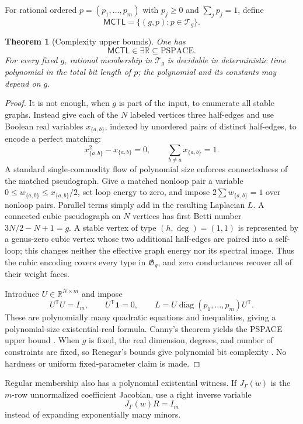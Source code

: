 \documentclass[11pt,reqno]{amsart}
\newtheorem{theorem}{Theorem}[section]
\theoremstyle{definition}
\theoremstyle{remark}
\newcommand{\one}{\mathbf 1}
\newcommand{\R}{\mathbb R}
\newcommand{\diag}{\operatorname{diag}}
\begin{document}
For rational ordered $p=(p_1,\ldots,p_m)$ with $p_j\ge0$ and
$\sum_jp_j=1$, define
\[
 \textsf{MCTL}=\{(g,p):p\in\mathcal T_g\}.
\]

\begin{theorem}[Complexity upper bounds]\label{thm:MCTL-complexity}
One has
\[
 \textsf{MCTL}\in\exists\mathbb R\subseteq\mathrm{PSPACE}.
\]
For every fixed $g$, rational membership in $\mathcal T_g$ is decidable in
deterministic time polynomial in the total bit length of $p$; the polynomial
and its constants may depend on $g$.
\end{theorem}

\begin{proof}
It is not enough, when $g$ is part of the input, to enumerate all stable
graphs.  Instead give each of the $N$ labeled vertices three half-edges and
use Boolean real variables $x_{\{a,b\}}$, indexed by unordered pairs of
distinct half-edges, to encode a perfect matching:
\[
 x_{\{a,b\}}^2-x_{\{a,b\}}=0,\qquad
 \sum_{b\ne a}x_{\{a,b\}}=1.
\]
A standard single-commodity flow of polynomial size enforces connectedness
of the matched pseudograph.  Give a matched nonloop pair a variable
$0\le w_{\{a,b\}}\le x_{\{a,b\}}/2$, set loop energy to zero, and impose
$2\sum w_{\{a,b\}}=1$ over nonloop pairs.  Parallel terms simply add in the resulting Laplacian
$L$.  A connected cubic pseudograph on $N$ vertices has first Betti number
$3N/2-N+1=g$.  A stable vertex of type $(h,\deg)=(1,1)$ is represented by a
genus-zero cubic vertex whose two additional half-edges are paired into a
self-loop; this changes neither the effective graph energy nor its spectral
image.  Thus the cubic encoding covers every type in $\mathfrak G_g$, and
zero conductances recover all of their weight faces.

Introduce $U\in\R^{N\times m}$ and impose
\begin{equation}\label{eq:ETR-eigenbasis}
 U^{\mathsf T}U=I_m,\qquad U^{\mathsf T}\one=0,\qquad
 L=U\diag(p_1,\ldots,p_m)U^{\mathsf T}.
\end{equation}
These are polynomially many quadratic equations and inequalities, giving a
polynomial-size existential-real formula.  Canny's theorem yields the PSPACE
upper bound \cite{Canny1988}.  When $g$ is fixed, the real dimension, degrees,
and number of constraints are fixed, so Renegar's bounds give polynomial bit
complexity \cite{Renegar1992I}.  No hardness or uniform fixed-parameter claim
is made.
\end{proof}

Regular membership also has a polynomial existential witness.  If
$J_\Gamma(w)$ is the $m$-row unnormalized coefficient Jacobian, use a right
inverse variable
\begin{equation}\label{eq:right-inverse-witness}
 J_\Gamma(w)R=I_m
\end{equation}
instead of expanding exponentially many minors.
\end{document}
